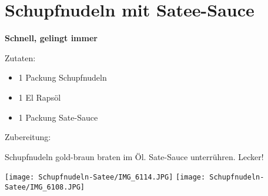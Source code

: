 \section{Schupfnudeln mit Satee-Sauce}

\textbf{Schnell, gelingt immer}

Zutaten:
\begin{itemize}
    \item 1 Packung Schupfnudeln
    \item 1 El Rapsöl
    \item 1 Packung Sate-Sauce
\end{itemize}

\noindent Zubereitung:

\noindent Schupfnudeln gold-braun braten im Öl. Sate-Sauce unterrühren. Lecker!

\newpage
\mbox{}
\vfill
\begin{center}
    \texttt{[image: Schupfnudeln-Satee/IMG\_6114.JPG]}
    \vfill
    \texttt{[image: Schupfnudeln-Satee/IMG\_6108.JPG]}
\end{center}
\vfill
\mbox{ }
\newpage
